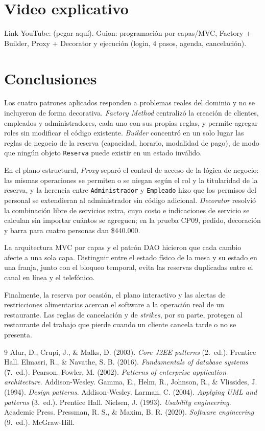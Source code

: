\documentclass[12pt]{article}
\begin{document}
\section{Video explicativo}
Link YouTube: (pegar aqu\'i). Guion: programaci\'on por capas/MVC, Factory + Builder, Proxy + Decorator y ejecuci\'on (login, 4 pasos, agenda, cancelaci\'on).
\section{Conclusiones}
Los cuatro patrones aplicados responden a problemas reales del dominio y no se incluyeron de forma decorativa. \textit{Factory Method} centralizó la creación de clientes, empleados y administradores, cada uno con sus propias reglas, y permite agregar roles sin modificar el código existente. \textit{Builder} concentró en un solo lugar las reglas de negocio de la reserva (capacidad, horario, modalidad de pago), de modo que ningún objeto \texttt{Reserva} puede existir en un estado inválido.

En el plano estructural, \textit{Proxy} separó el control de acceso de la lógica de negocio: las mismas operaciones se permiten o se niegan según el rol y la titularidad de la reserva, y la herencia entre \texttt{Administrador} y \texttt{Empleado} hizo que los permisos del personal se extendieran al administrador sin código adicional. \textit{Decorator} resolvió la combinación libre de servicios extra, cuyo costo e indicaciones de servicio se calculan sin importar cuántos se agreguen; en la prueba CP09, pedido, decoración y barra para cuatro personas dan \$440.000.

La arquitectura MVC por capas y el patrón DAO hicieron que cada cambio afecte a una sola capa. Distinguir entre el estado físico de la mesa y su estado en una franja, junto con el bloqueo temporal, evita las reservas duplicadas entre el canal en línea y el telefónico.

Finalmente, la reserva por ocasión, el plano interactivo y las alertas de restricciones alimentarias acercan el software a la operación real de un restaurante. Las reglas de cancelación y de \textit{strikes}, por su parte, protegen al restaurante del trabajo que pierde cuando un cliente cancela tarde o no se presenta.
\begin{thebibliography}{9}
 Alur, D., Crupi, J., \& Malks, D. (2003). \textit{Core J2EE patterns} (2.\textordfeminine\ ed.). Prentice Hall.
 Elmasri, R., \& Navathe, S. B. (2016). \textit{Fundamentals of database systems} (7.\textordfeminine\ ed.). Pearson.
 Fowler, M. (2002). \textit{Patterns of enterprise application architecture}. Addison-Wesley.
 Gamma, E., Helm, R., Johnson, R., \& Vlissides, J. (1994). \textit{Design patterns}. Addison-Wesley.
 Larman, C. (2004). \textit{Applying UML and patterns} (3.\textordfeminine\ ed.). Prentice Hall.
 Nielsen, J. (1993). \textit{Usability engineering}. Academic Press.
 Pressman, R. S., \& Maxim, B. R. (2020). \textit{Software engineering} (9.\textordfeminine\ ed.). McGraw-Hill.
\end{thebibliography}
\appendix
\end{document}
